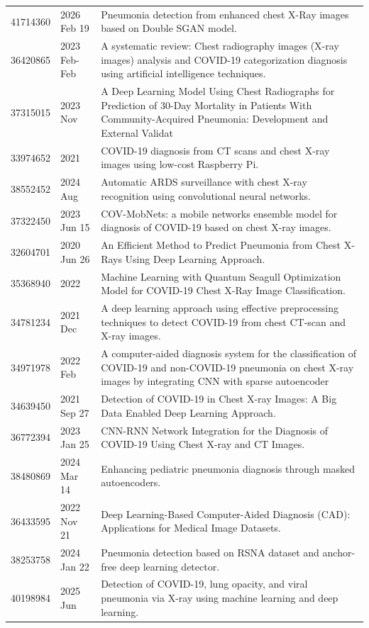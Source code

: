 \begin{longtable}{llp{9.5cm}}
41714360 & 2026 Feb 19 & Pneumonia detection from enhanced chest X-Ray images based on Double SGAN model. \\
36420865 & 2023 Feb-Feb & A systematic review: Chest radiography images (X-ray images) analysis and COVID-19 categorization diagnosis using artificial intelligence techniques. \\
37315015 & 2023 Nov & A Deep Learning Model Using Chest Radiographs for Prediction of 30-Day Mortality in Patients With Community-Acquired Pneumonia: Development and External Validat \\
33974652 & 2021 & COVID-19 diagnosis from CT scans and chest X-ray images using low-cost Raspberry Pi. \\
38552452 & 2024 Aug & Automatic ARDS surveillance with chest X-ray recognition using convolutional neural networks. \\
37322450 & 2023 Jun 15 & COV-MobNets: a mobile networks ensemble model for diagnosis of COVID-19 based on chest X-ray images. \\
32604701 & 2020 Jun 26 & An Efficient Method to Predict Pneumonia from Chest X-Rays Using Deep Learning Approach. \\
35368940 & 2022 & Machine Learning with Quantum Seagull Optimization Model for COVID-19 Chest X-Ray Image Classification. \\
34781234 & 2021 Dec & A deep learning approach using effective preprocessing techniques to detect COVID-19 from chest CT-scan and X-ray images. \\
34971978 & 2022 Feb & A computer-aided diagnosis system for the classification of COVID-19 and non-COVID-19 pneumonia on chest X-ray images by integrating CNN with sparse autoencoder \\
34639450 & 2021 Sep 27 & Detection of COVID-19 in Chest X-ray Images: A Big Data Enabled Deep Learning Approach. \\
36772394 & 2023 Jan 25 & CNN-RNN Network Integration for the Diagnosis of COVID-19 Using Chest X-ray and CT Images. \\
38480869 & 2024 Mar 14 & Enhancing pediatric pneumonia diagnosis through masked autoencoders. \\
36433595 & 2022 Nov 21 & Deep Learning-Based Computer-Aided Diagnosis (CAD): Applications for Medical Image Datasets. \\
38253758 & 2024 Jan 22 & Pneumonia detection based on RSNA dataset and anchor-free deep learning detector. \\
40198984 & 2025 Jun & Detection of COVID-19, lung opacity, and viral pneumonia via X-ray using machine learning and deep learning. \\

\end{longtable}
